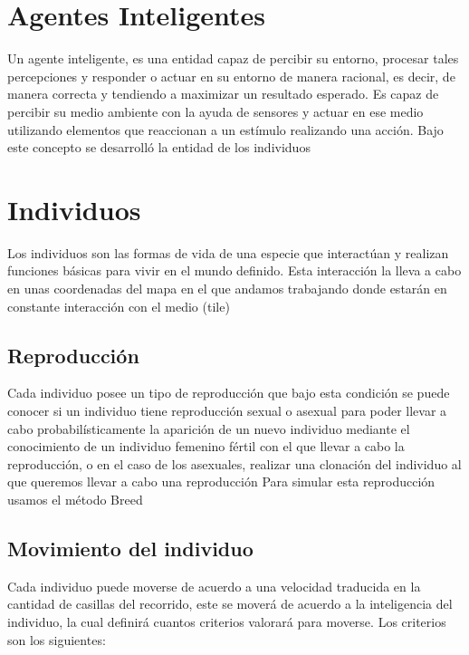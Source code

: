 \documentclass{llncs}
\begin{document}
\section{Agentes Inteligentes}
Un agente inteligente, es una entidad capaz de percibir su entorno, procesar tales percepciones y responder o actuar en su entorno de manera racional, es decir, de manera correcta y tendiendo a maximizar un resultado esperado. Es capaz de percibir su medio ambiente con la ayuda de sensores y actuar en ese medio utilizando elementos que reaccionan a un estímulo realizando una acción.
\newline
\newline
Bajo este concepto se desarrolló la entidad de los individuos 


\section{Individuos}
Los individuos son las formas de vida de una especie que interactúan y realizan funciones básicas para vivir en el mundo definido. Esta interacción la lleva a cabo en unas coordenadas del mapa en el que andamos trabajando donde estarán en constante interacción con el medio (tile)

\subsection{Reproducción}
Cada individuo posee un tipo de reproducción que bajo esta condición se puede conocer si un individuo tiene reproducción sexual o asexual para poder llevar a cabo probabilísticamente la aparición de un nuevo individuo mediante el conocimiento de un individuo femenino fértil con el que llevar a cabo la reproducción, o en el caso de los asexuales, realizar una clonación del individuo al que queremos llevar a cabo una reproducción
\newline
\newline
Para simular esta reproducción usamos el método Breed

\subsection{Movimiento del individuo}
Cada individuo puede moverse de acuerdo a una velocidad traducida en la cantidad
de casillas del recorrido, este se moverá de acuerdo a la inteligencia del individuo, la cual definirá cuantos criterios valorará para moverse.
\newline
\newline
Los criterios son los siguientes:
\end{document}
